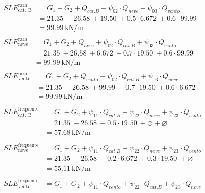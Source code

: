 \begin{align}
	\begin{split}
	SLE^{\text{rara}}_{\text{cat. B}} &= G_1 + G_2 + Q_{cat. B} + \psi_{02}\cdot Q_{neve} + \psi_{03}\cdot Q_{vento}  \\
	&= \SI{21.35}{} + \SI{26.58}{} + \SI{19.50}{} + 0.5\cdot\SI{6.672}{} + 0.6\cdot\SI{99.99}{}\\
	&= \SI{99.99}{\kilo\newton\per\meter}
	\end{split} \\ 
	\begin{split}
	SLE^{\text{rara}}_{\text{neve}} &= G_1 + G_2 + Q_{neve} + \psi_{02}\cdot Q_{cat. B} + \psi_{03}\cdot Q_{vento}  \\
	&= \SI{21.35}{} + \SI{26.58}{} + \SI{6.672}{} + 0.7\cdot\SI{19.50}{} + 0.6\cdot\SI{99.99}{}\\
	&= \SI{99.99}{\kilo\newton\per\meter}
	\end{split} \\ 
	\begin{split}
	SLE^{\text{rara}}_{\text{vento}} &= G_1 + G_2 + Q_{vento} + \psi_{02}\cdot Q_{cat. B} + \psi_{03}\cdot Q_{neve}  \\
	&= \SI{21.35}{} + \SI{26.58}{} + \SI{99.99}{} + 0.7\cdot\SI{19.50}{} + 0.6\cdot\SI{6.672}{}\\
	&= \SI{99.99}{\kilo\newton\per\meter}
	\end{split} \\ 
	\begin{split}
	SLE^{\text{frequente}}_{\text{cat. B}} &= G_1 + G_2 + \psi_{11}\cdot Q_{cat. B} + \psi_{22}\cdot Q_{neve} + \psi_{23}\cdot Q_{vento}  \\
	&= \SI{21.35}{} + \SI{26.58}{} + 0.5\cdot\SI{19.50}{} + \varnothing +\varnothing\\
	&= \SI{57.68}{\kilo\newton\per\meter}
	\end{split} \\ 
	\begin{split}
	SLE^{\text{frequente}}_{\text{neve}} &= G_1 + G_2 + \psi_{11}\cdot Q_{cat. B} + \psi_{22}\cdot Q_{neve} + \psi_{23}\cdot Q_{vento}  \\
	&= \SI{21.35}{} + \SI{26.58}{} + 0.2\cdot\SI{6.672}{} + 0.3\cdot\SI{19.50}{} + \varnothing \\
	&= \SI{55.11}{\kilo\newton\per\meter}
	\end{split} \\ 
	\begin{split}
	SLE^{\text{frequente}}_{\text{vento}} &= G_1 + G_2 + \psi_{11}\cdot Q_{vento} + \psi_{22}\cdot Q_{cat. B} + \psi_{23}\cdot Q_{neve}  \\

\end{split}
\end{align}
